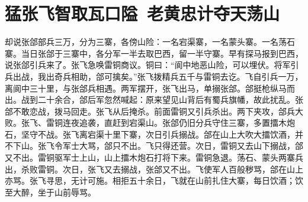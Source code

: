 \chapter{猛张飞智取瓦口隘~老黄忠计夺天荡山}

却说张郃部兵三万，分为三寨，各傍山险：一名宕渠寨，一名蒙头寨。一名荡石寨。当日张郃于三寨中，各分军一半去取巴西，留一半守寨。早有探马报到巴西，说张郃引兵来了。张飞急唤雷铜商议。铜曰：“阆中地恶山险，可以埋伏。将军引兵出战，我出奇兵相助，郃可擒矣。”张飞拨精兵五千与雷铜去讫。飞自引兵一万，离阆中三十里，与张郃兵相遇。两军摆开，张飞出马，单搦张郃。郃挺枪纵马而出。战到二十余合，郃后军忽然喊起：原来望见山背后有蜀兵旗幡，故此扰乱。张郃不敢恋战，拨马回走。张飞从后掩杀。前面雷铜又引兵杀出。两下夹攻，郃兵大败。张飞、雷铜连夜追袭，直赶到宕渠山。张郃仍旧分兵守住三寨，多置擂木炮石，坚守不战。张飞离宕渠十里下寨，次日引兵搦战。郃在山上大吹大擂饮酒，并不下山。张飞令军士大骂，郃只不出。飞只得还营。次日，雷铜又去山下搦战，郃又不出。雷铜驱军士上山，山上擂木炮石打将下来。雷铜急退。荡石、蒙头两寨兵出，杀败雷铜。次日，张飞又去搦战，张郃又不出。飞使军人百般秽骂，郃在山上亦骂。张飞寻思，无计可施。相拒五十余日，飞就在山前扎住大寨，每日饮酒；饮至大醉，坐于山前辱骂。

